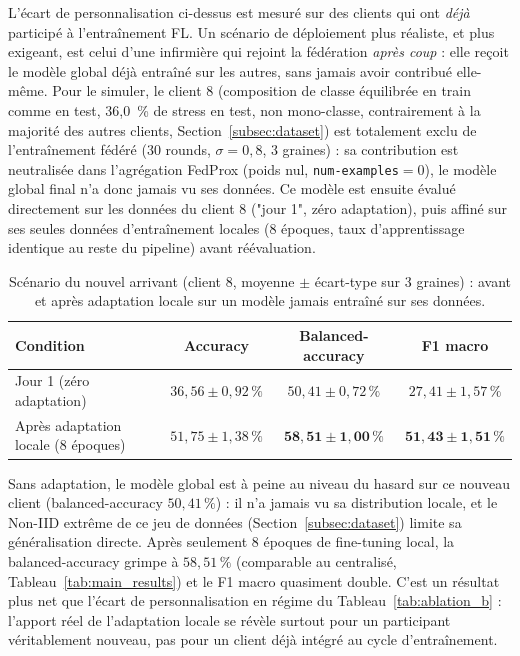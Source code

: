 \documentclass{article}
\begin{document}
L'écart de personnalisation ci-dessus est mesuré sur des clients qui ont \emph{déjà}
participé à l'entraînement FL. Un scénario de déploiement plus réaliste, et plus
exigeant, est celui d'une infirmière qui rejoint la fédération \emph{après coup} : elle
reçoit le modèle global déjà entraîné sur les autres, sans jamais avoir contribué elle-même.
Pour le simuler, le client 8 (composition de classe équilibrée en train comme en test,
36,0~\% de stress en test, non mono-classe, contrairement à la majorité des autres
clients, Section~\ref{subsec:dataset}) est totalement exclu de l'entraînement fédéré
(30 rounds, $\sigma=0{,}8$, 3 graines) : sa contribution est neutralisée dans
l'agrégation FedProx (poids nul, \texttt{num-examples}$=0$), le modèle global final
n'a donc jamais vu ses données. Ce modèle est ensuite évalué directement sur les
données du client 8 ("jour 1", zéro adaptation), puis affiné sur ses seules données
d'entraînement locales (8 époques, taux d'apprentissage identique au reste du
pipeline) avant réévaluation.

\begin{table}[h!]
  \centering
  \caption{Scénario du nouvel arrivant (client 8, moyenne $\pm$ écart-type sur 3
  graines) : avant et après adaptation locale sur un modèle jamais entraîné sur ses
  données.}
  \label{tab:late_joiner}
  \begin{tabular}{lccc}
    \toprule
    Condition & Accuracy & Balanced-accuracy & F1 macro \\
    \midrule
    Jour 1 (zéro adaptation) & $36{,}56 \pm 0{,}92\,\%$ & $50{,}41 \pm 0{,}72\,\%$ & $27{,}41 \pm 1{,}57\,\%$ \\
    Après adaptation locale (8 époques) & $51{,}75 \pm 1{,}38\,\%$ & $\mathbf{58{,}51 \pm 1{,}00\,\%}$ & $\mathbf{51{,}43 \pm 1{,}51\,\%}$ \\
    \bottomrule
  \end{tabular}
\end{table}

Sans adaptation, le modèle global est à peine au niveau du hasard sur ce nouveau client
(balanced-accuracy $50{,}41\,\%$) : il n'a jamais vu sa distribution locale, et le
Non-IID extrême de ce jeu de données (Section~\ref{subsec:dataset}) limite sa
généralisation directe. Après seulement 8 époques de fine-tuning local, la
balanced-accuracy grimpe à $58{,}51\,\%$ (comparable au centralisé,
Tableau~\ref{tab:main_results}) et le F1 macro quasiment double. C'est un résultat plus
net que l'écart de personnalisation \og en régime \fg{} du Tableau~\ref{tab:ablation_b}
: l'apport réel de l'adaptation locale se révèle surtout pour un participant
véritablement nouveau, pas pour un client déjà intégré au cycle d'entraînement.
\end{document}
